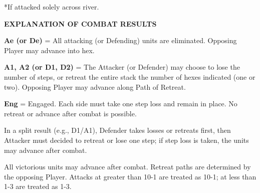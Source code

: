 \begin{strip}
  \medskip
  *If attacked solely across river.

  \bigskip

\end{strip}

\begin{flushleft}
  \textbf{EXPLANATION OF COMBAT RESULTS}
\end{flushleft}

\textbf{Ae (or De)} = All attacking (or Defending) units are eliminated. Opposing Player may advance into hex.
\par
\textbf{A1, A2 (or D1, D2)} = The Attacker (or Defender) may choose to lose the number of steps, or retreat the entire stack the number of hexes indicated (one or two). Opposing Player may advance along Path of Retreat.
\par
\textbf{Eng} = Engaged. Each side must take one step loss and remain in place. No retreat or advance after combat is possible.
\par
In a split result (e.g., D1/A1), Defender takes losses or retreats first, then Attacker must decided to retreat or lose one step; if step loss is taken, the units may advance after combat.
\par
All victorious units may advance after combat. Retreat paths are determined by the opposing Player. Attacks at greater than 10-1 are treated as 10-1; at less than 1-3 are treated as 1-3.